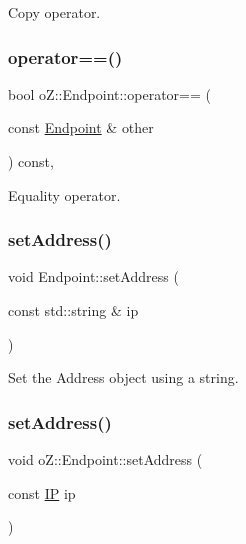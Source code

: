 Copy operator. 

\mbox{\label{classo_z_1_1_endpoint_ab5a405bf455ab2f4e28458b0ba69d399}} 
\subsubsection{\texorpdfstring{operator==()}{operator==()}}
{\footnotesize\ttfamily bool o\+Z\+::\+Endpoint\+::operator== (\begin{DoxyParamCaption}\item[{const \mbox{\hyperlink{classo_z_1_1_endpoint}{Endpoint}} \&}]{other }\end{DoxyParamCaption}) const\hspace{0.3cm}{\ttfamily [inline]}, {\ttfamily [noexcept]}}



Equality operator. 

\mbox{\label{classo_z_1_1_endpoint_a90caf5f6497ec5a09b34d7a6069502da}} 
\subsubsection{\texorpdfstring{setAddress()}{setAddress()}\hspace{0.1cm}{\footnotesize\ttfamily [1/2]}}
{\footnotesize\ttfamily void Endpoint\+::set\+Address (\begin{DoxyParamCaption}\item[{const std\+::string \&}]{ip }\end{DoxyParamCaption})}



Set the Address object using a string. 

\mbox{\label{classo_z_1_1_endpoint_ab59c67d8538e05a0bc5192777296d47a}} 
\subsubsection{\texorpdfstring{setAddress()}{setAddress()}\hspace{0.1cm}{\footnotesize\ttfamily [2/2]}}
{\footnotesize\ttfamily void o\+Z\+::\+Endpoint\+::set\+Address (\begin{DoxyParamCaption}\item[{const \mbox{\hyperlink{namespaceo_z_ace55c2d0182a14ceea9649d0d0cf9c4a}{IP}}}]{ip }\end{DoxyParamCaption})\hspace{0.3cm}{\ttfamily [inline]}}




